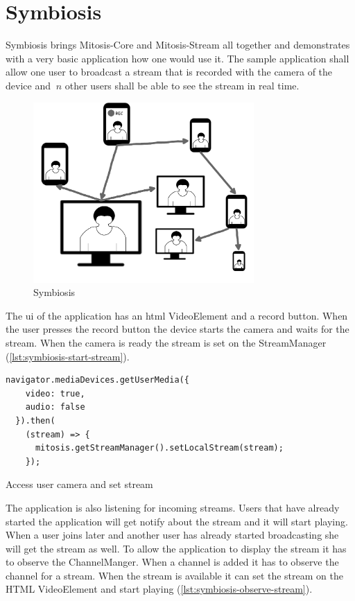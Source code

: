 \section{Symbiosis}\label{sec:symbiosis}
Symbiosis brings Mitosis-Core and Mitosis-Stream all together and demonstrates with a very basic application how one would use it.
The sample application shall allow one user to broadcast a stream that is recorded with the camera of the device and $\ n $ other users shall be able to see the stream in real time.

\begin{figure}
\centering
\includegraphics[width=0.75\textwidth]{graphics/implementation/symbiosis.pdf}
\caption{Symbiosis}
\label{fig:symbiosis-implementation}
\end{figure}

The \gls{ui} of the application has an \gls{html} VideoElement and a record button. When the user presses the record button the device starts the camera and waits for the stream. When the camera is ready the stream is set on the StreamManager (\vref{lst:symbiosis-start-stream}).

\begin{Listing}
\begin{lstlisting}
navigator.mediaDevices.getUserMedia({
    video: true,
    audio: false
  }).then(
    (stream) => {
      mitosis.getStreamManager().setLocalStream(stream);
    });
\end{lstlisting}
\caption{Access user camera and set stream}
\label{lst:symbiosis-start-stream}
\end{Listing}

The application is also listening for incoming streams. Users that have already started the application will get notify about the stream and it will start playing. When a user joins later and another user has already started broadcasting she will get the stream as well.
To allow the application to display the stream it has to observe the ChannelManger. When a channel is added it has to observe the channel for a stream. When the stream is available it can set the stream on the HTML VideoElement and start playing (\vref{lst:symbiosis-observe-stream}).

